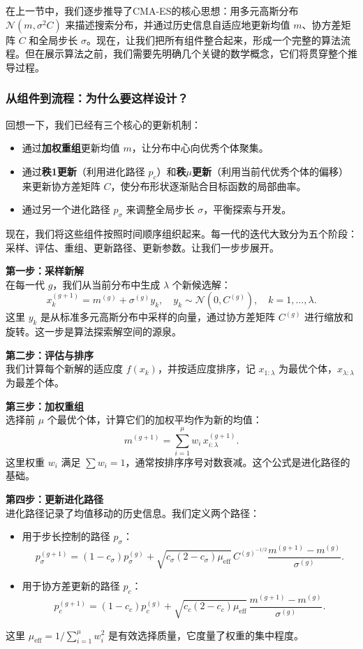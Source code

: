 \documentclass[lang=cn,zihao=-4,a4paper,fontset=windows]{beautybook}
\begin{document}
在上一节中，我们逐步推导了CMA-ES的核心思想：用多元高斯分布 \( \mathcal{N}(m, \sigma^2 C) \) 来描述搜索分布，并通过历史信息自适应地更新均值 \( m \)、协方差矩阵 \( C \) 和全局步长 \( \sigma \)。现在，让我们把所有组件整合起来，形成一个完整的算法流程。但在展示算法之前，我们需要先明确几个关键的数学概念，它们将贯穿整个推导过程。

\subsubsection{从组件到流程：为什么要这样设计？}

回想一下，我们已经有三个核心的更新机制：
\begin{itemize}
    \item 通过\textbf{加权重组}更新均值 \( m \)，让分布中心向优秀个体聚集。
    \item 通过\textbf{秩1更新}（利用进化路径 \( p_c \)）和\textbf{秩$\mu$更新}（利用当前代优秀个体的偏移）来更新协方差矩阵 \( C \)，使分布形状逐渐贴合目标函数的局部曲率。
    \item 通过另一个进化路径 \( p_\sigma \) 来调整全局步长 \( \sigma \)，平衡探索与开发。
\end{itemize}

现在，我们将这些组件按照时间顺序组织起来。每一代的迭代大致分为五个阶段：采样、评估、重组、更新路径、更新参数。让我们一步步展开。

\textbf{第一步：采样新解} \\
在每一代 \( g \)，我们从当前分布中生成 \( \lambda \) 个新候选解：
\[
x_k^{(g+1)} = m^{(g)} + \sigma^{(g)} y_k, \quad y_k \sim \mathcal{N}(0, C^{(g)}), \quad k = 1, \dots, \lambda.
\]
这里 \( y_k \) 是从标准多元高斯分布中采样的向量，通过协方差矩阵 \( C^{(g)} \) 进行缩放和旋转。这一步是算法探索解空间的源泉。

\textbf{第二步：评估与排序} \\
我们计算每个新解的适应度 \( f(x_k) \)，并按适应度排序，记 \( x_{1:\lambda} \) 为最优个体，\( x_{\lambda:\lambda} \) 为最差个体。

\textbf{第三步：加权重组} \\
选择前 \( \mu \) 个最优个体，计算它们的加权平均作为新的均值：
\[
m^{(g+1)} = \sum_{i=1}^{\mu} w_i \, x_{i:\lambda}^{(g+1)}.
\]
这里权重 \( w_i \) 满足 \( \sum w_i = 1 \)，通常按排序序号对数衰减。这个公式是进化路径的基础。

\textbf{第四步：更新进化路径} \\
进化路径记录了均值移动的历史信息。我们定义两个路径：
\begin{itemize}
    \item 用于步长控制的路径 \( p_\sigma \)：
    \[
    p_\sigma^{(g+1)} = (1 - c_\sigma) p_\sigma^{(g)} + \sqrt{c_\sigma(2 - c_\sigma)\mu_{\text{eff}}} \, C^{(g)^{-1/2}} \frac{m^{(g+1)} - m^{(g)}}{\sigma^{(g)}}.
    \]
    \item 用于协方差更新的路径 \( p_c \)：
    \[
    p_c^{(g+1)} = (1 - c_c) p_c^{(g)} + \sqrt{c_c(2 - c_c)\mu_{\text{eff}}} \, \frac{m^{(g+1)} - m^{(g)}}{\sigma^{(g)}}.
    \]
\end{itemize}
这里 \( \mu_{\text{eff}} = 1 / \sum_{i=1}^{\mu} w_i^2 \) 是有效选择质量，它度量了权重的集中程度。
\end{document}
